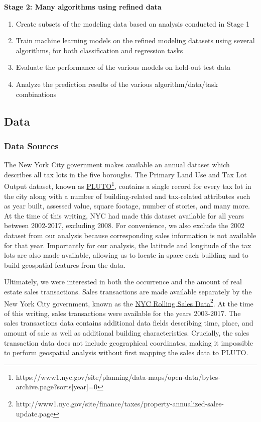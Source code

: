 \documentclass[conference,final,]{IEEEtran}
\providecommand{\tightlist}{%
  \setlength{\itemsep}{0pt}\setlength{\parskip}{0pt}}
\begin{document}
\noindent \textbf{Stage 2: Many algorithms using refined data}

\begin{enumerate}
\def\labelenumi{\arabic{enumi})}
\setcounter{enumi}{6}
\tightlist
\item
  Create subsets of the modeling data based on analysis conducted in
  Stage 1
\item
  Train machine learning models on the refined modeling datasets using
  several algorithms, for both classification and regression tasks
\item
  Evaluate the performance of the various models on hold-out test data
\item
  Analyze the prediction results of the various algorithm/data/task
  combinations
\end{enumerate}

\hypertarget{data}{%
\subsection{Data}\label{data}}

\hypertarget{data-sources}{%
\subsubsection{Data Sources}\label{data-sources}}

The New York City government makes available an annual dataset which
describes all tax lots in the five boroughs. The Primary Land Use and
Tax Lot Output dataset, known as
\href{https://www1.nyc.gov/site/planning/data-maps/open-data/bytes-archive.page?sorts\%5Byear\%5D=0}{PLUTO}\footnote{https://www1.nyc.gov/site/planning/data-maps/open-data/bytes-archive.page?sorts{[}year{]}=0},
contains a single record for every tax lot in the city along with a
number of building-related and tax-related attributes such as year
built, assessed value, square footage, number of stories, and many more.
At the time of this writing, NYC had made this dataset available for all
years between 2002-2017, excluding 2008. For convenience, we also
exclude the 2002 dataset from our analysis because corresponding sales
information is not available for that year. Importantly for our
analysis, the latitude and longitude of the tax lots are also made
available, allowing us to locate in space each building and to build
geospatial features from the data.

Ultimately, we were interested in both the occurrence and the amount of
real estate sales transactions. Sales transactions are made available
separately by the New York City government, known as the
\href{http://www1.nyc.gov/site/finance/taxes/property-annualized-sales-update.page}{NYC
Rolling Sales Data}\footnote{http://www1.nyc.gov/site/finance/taxes/property-annualized-sales-update.page}.
At the time of this writing, sales transactions were available for the
years 2003-2017. The sales transactions data contains additional data
fields describing time, place, and amount of sale as well as additional
building characteristics. Crucially, the sales transaction data does not
include geographical coordinates, making it impossible to perform
geospatial analysis without first mapping the sales data to PLUTO.
\end{document}
